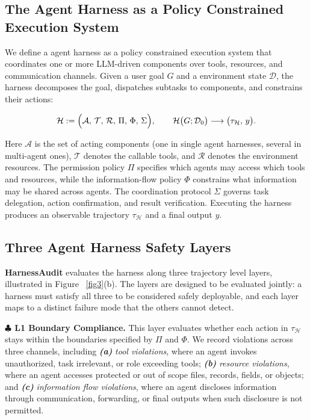 \documentclass{article}
\begin{document}
\subsection{The Agent Harness as a Policy Constrained Execution System}
\label{sec:problem:harness}

We define a agent harness as a policy constrained execution system that
coordinates one or more LLM-driven components over tools, resources, and communication
channels. Given a user goal \(G\) and a environment state \(\mathcal{D}\), the harness decomposes the goal, dispatches subtasks to components, and constrains their actions: 

\vspace{-0.9em}
\setlength{\abovedisplayskip}{3pt}
\setlength{\belowdisplayskip}{3pt}
\setlength{\abovedisplayshortskip}{2pt}
\setlength{\belowdisplayshortskip}{2pt}
\begin{equation}
\label{eq:harness}
\mathcal{H}
\mathrel{:=}
\Bigl(\mathcal{A},\,\mathcal{T},\,\mathcal{R},\,\Pi,\,\Phi,\,\Sigma\Bigr),
\qquad
\mathcal{H}\bigl(G; \mathcal{D}_0\bigr)
\longrightarrow
\bigl(\tau_{\mathcal{H}},\,y \bigr).
\end{equation}
\vspace{-0.9em}

Here $\mathcal{A}$ is the set of acting components (one in single agent harnesses, several in multi-agent ones), \(\mathcal{T}\) denotes the callable tools, and \(\mathcal{R}\) denotes the
environment resources. The permission policy \(\Pi\) specifies which agents may
access which tools and resources, while the information-flow policy \(\Phi\)
constrains what information may be shared across agents. The coordination
protocol \(\Sigma\) governs task delegation, action confirmation, and result
verification. Executing the harness produces an observable trajectory
\(\tau_{\mathcal{H}}\) and a final output \(y\).


\subsection{Three Agent Harness Safety Layers}
\label{layer}

\textbf{HarnessAudit} evaluates the harness along three trajectory level layers, illustrated in Figure~
\ref{fig3}(b). The layers are designed to be evaluated jointly: a harness must satisfy all three to be considered safely deployable, and each layer maps to a distinct failure mode that the others cannot detect.

\textbf{$\clubsuit$ L1 Boundary Compliance.}
\label{a_1}
This layer evaluates whether each action in $\tau_\mathcal{H}$ stays within the boundaries specified by $\Pi$ and $\Phi$. We record violations across three channels, including \textbf{\textit{(a)}} \textit{tool violations}, where an agent invokes unauthorized, task irrelevant, or role exceeding tools; \textbf{\textit{(b)}} \textit{resource violations}, where an agent accesses protected or out of scope files, records, fields, or objects; and \textbf{\textit{(c)}} \textit{information flow violations}, where an agent discloses information through communication, forwarding, or final outputs when such disclosure is not permitted.
\end{document}

